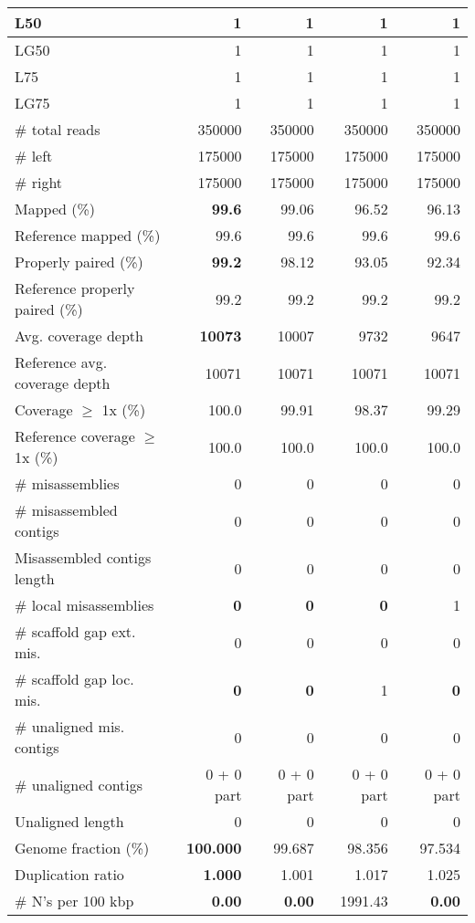 \documentclass[12pt,a4paper]{article}
\begin{document}
\begin{table}[ht]
\begin{center}
\begin{tabular}{|l*{4}{|r}|}
L50 & 1 & 1 & 1 & 1 \\ \hline
LG50 & 1 & 1 & 1 & 1 \\ \hline
L75 & 1 & 1 & 1 & 1 \\ \hline
LG75 & 1 & 1 & 1 & 1 \\ \hline
\# total reads & 350000 & 350000 & 350000 & 350000 \\ \hline
\# left & 175000 & 175000 & 175000 & 175000 \\ \hline
\# right & 175000 & 175000 & 175000 & 175000 \\ \hline
Mapped (\%) & {\bf 99.6} & 99.06 & 96.52 & 96.13 \\ \hline
Reference mapped (\%) & 99.6 & 99.6 & 99.6 & 99.6 \\ \hline
Properly paired (\%) & {\bf 99.2} & 98.12 & 93.05 & 92.34 \\ \hline
Reference properly paired (\%) & 99.2 & 99.2 & 99.2 & 99.2 \\ \hline
Avg. coverage depth & {\bf 10073} & 10007 & 9732 & 9647 \\ \hline
Reference avg. coverage depth & 10071 & 10071 & 10071 & 10071 \\ \hline
Coverage $\geq$ 1x (\%) & 100.0 & 99.91 & 98.37 & 99.29 \\ \hline
Reference coverage $\geq$ 1x (\%) & 100.0 & 100.0 & 100.0 & 100.0 \\ \hline
\# misassemblies & 0 & 0 & 0 & 0 \\ \hline
\# misassembled contigs & 0 & 0 & 0 & 0 \\ \hline
Misassembled contigs length & 0 & 0 & 0 & 0 \\ \hline
\# local misassemblies & {\bf 0} & {\bf 0} & {\bf 0} & 1 \\ \hline
\# scaffold gap ext. mis. & 0 & 0 & 0 & 0 \\ \hline
\# scaffold gap loc. mis. & {\bf 0} & {\bf 0} & 1 & {\bf 0} \\ \hline
\# unaligned mis. contigs & 0 & 0 & 0 & 0 \\ \hline
\# unaligned contigs & 0 + 0 part & 0 + 0 part & 0 + 0 part & 0 + 0 part \\ \hline
Unaligned length & 0 & 0 & 0 & 0 \\ \hline
Genome fraction (\%) & {\bf 100.000} & 99.687 & 98.356 & 97.534 \\ \hline
Duplication ratio & {\bf 1.000} & 1.001 & 1.017 & 1.025 \\ \hline
\# N's per 100 kbp & {\bf 0.00} & {\bf 0.00} & 1991.43 & {\bf 0.00} \\ \hline

\end{tabular}
\end{center}
\end{table}
\end{document}
